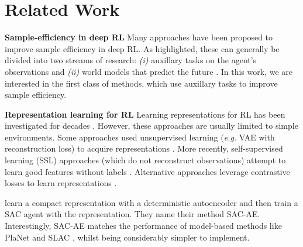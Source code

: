 \documentclass{article}
\makeatletter
\theoremstyle{plain}
\theoremstyle{definition}
\theoremstyle{remark}
\newcommand{\eg}{\textit{e.g.\@}\xspace}
\makeatother
\begin{document}
\section{Related Work}
\label{related_work}



\textbf{Sample-efficiency in deep RL}
Many approaches have been proposed to improve sample efficiency in deep RL.
As \citet{laskinCURLContrastiveUnsupervised2020} highlighted, these can generally be divided into two streams of research:
{\em (i)} auxillary tasks on the agent's observations and {\em (ii)} world models that predict the future
\citep{haRecurrentWorldModels2018,hafnerLearning2019,hansenTemporalDifferenceLearning2022}.
In this work, we are interested in the first class of methods, which use auxillary tasks to improve sample efficiency.

\textbf{Representation learning for RL}
Learning representations for RL has been investigated for decades
\citep{abelOptimalBehaviorApproximate2016,mannorDynamicAbstractionReinforcement2004,liUnifiedTheoryState2006,andreStateAbstractionProgrammable2002,deardenAbstractionApproximateDecisiontheoretic1997,singhReinforcementLearningSoft1994,higginsDefinitionDisentangledRepresentations2018,vanhoofStableReinforcementLearning2016,watterEmbedControlLocally2015,ghoshRepresentationsStableOffPolicy2020}.
However, these approaches are usually limited to simple environments.
Some approaches used unsupervised learning (\eg VAE \citep{kingmaAutoEncoding2014} with reconstruction loss) to acquire representations
\cite{finnDeepSpatialAutoencoders2016,higginsDARLAImprovingZeroShot2017,langeAutonomousReinforcementLearning2012,watterEmbedControlLocally2015}.
More recently, self-supervised learning (SSL) approaches (which do not reconstruct observations)
attempt to learn good features without labels \cite{anandUnsupervisedStateRepresentation2019}.
Alternative approaches leverage contrastive losses to learn representations \cite{laskinCURLContrastiveUnsupervised2020}.

\citet{yaratsImprovingSampleEfficiency2021} learn a compact representation with a deterministic autoencoder and then train a
SAC agent \citep{haarnojaSoft2018} with the representation. They name their method SAC-AE.
Interestingly, SAC-AE matches the performance of model-based methods like PlaNet \citep{hafnerLearning2019}
and SLAC \citep{leeStochasticLatentActorCritic2020}, whilst being considerably simpler to implement.
\end{document}
